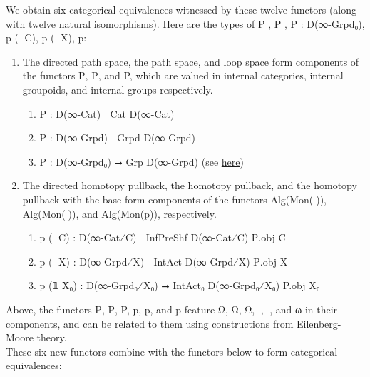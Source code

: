 \documentclass{book}
\theoremstyle{definition}
\begin{document}
We obtain six categorical equivalences witnessed by these twelve functors (along with twelve natural isomorphisms). Here are the types of P⃗ , P⃡ , P : D(∞-Grpd₀), p⃗ (𝟙 C), p⃡ (𝟙 X), p:

\begin{enumerate}
\item The directed path space, the path space, and loop space form components of the functors P⃗, P⃡, and P, which are valued in internal categories, internal groupoids, and internal groups respectively.
\begin{enumerate}
\item P⃗ : D(∞-Cat) ⭢ Cat D(∞-Cat)
\item P⃡ : D(∞-Grpd) ⭢ Grpd D(∞-Grpd)
\item P : D(∞-Grpd₀) ⭢ Grp D(∞-Grpd) (see \href{https://mathoverflow.net/questions/128883/why-omega-x-and-bg-are-adjoint-functors}{here})
\end{enumerate}
\item The directed homotopy pullback, the homotopy pullback, and the homotopy pullback with the base form components of the functors Alg(Mon(ω⃗)), Alg(Mon(ω⃡)), and Alg(Mon(p)), respectively. 
\begin{enumerate}
\item p⃗ (𝟙 C) : D(∞-Cat⁄C) ⭢ InfPreShf D(∞-Cat⁄C) P⃗.obj C 
\item p⃡ (𝟙 X) : D(∞-Grpd⁄X) ⭢ IntAct D(∞-Grpd⁄X) P⃡.obj X
\item p (𝟙 X₀) : D(∞-Grpd₀⁄X₀) ⭢ IntAct₀ D(∞-Grpd₀⁄X₀) P.obj X₀
\end{enumerate}
\end{enumerate}

Above, the functors P⃗, P⃡, P, p⃗, p⃡, and p feature Ω⃗, Ω⃡, Ω, ω⃗, ω⃡, and ω in their components, and can be related to them using constructions from Eilenberg-Moore theory.\\

These six new functors combine with the functors below to form categorical equivalences:\\
\end{document}

